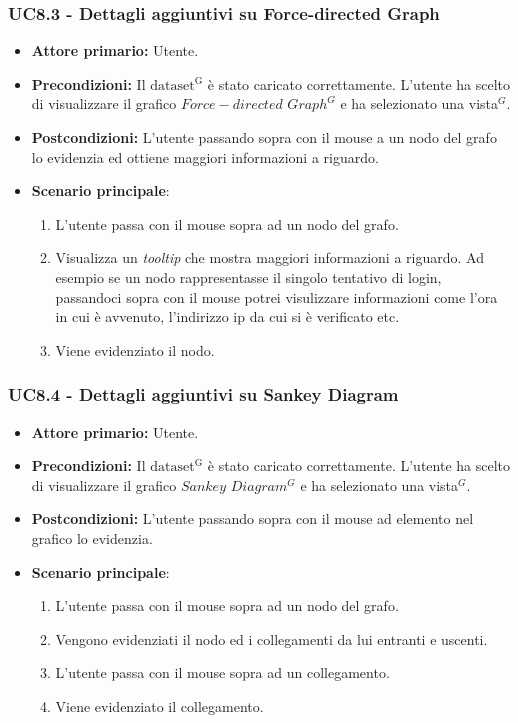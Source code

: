 \subsubsection{UC8.3 - Dettagli aggiuntivi su Force-directed Graph}
\label{sec:UC8.3}
\begin{itemize}
    \item \textbf{Attore primario:} Utente.
    \item \textbf{Precondizioni:} Il ${\mathrm{dataset^{G}}}$ è stato caricato correttamente. L'utente ha scelto di visualizzare il grafico $Force-directed$ $Graph^{G}$ e ha selezionato una vista$^{G}$.
    \item \textbf{Postcondizioni:} L'utente passando sopra con il mouse a un nodo del grafo lo evidenzia ed ottiene maggiori informazioni a riguardo.
    \item \textbf{Scenario principale}:
    \begin{enumerate}
		\item L'utente passa con il mouse sopra ad un nodo del grafo.
		\item Visualizza un \textit{tooltip} che mostra maggiori informazioni a riguardo. Ad esempio se un nodo rappresentasse il singolo tentativo di login, passandoci sopra con il mouse potrei visulizzare informazioni come l'ora in cui è avvenuto, l'indirizzo ip da cui si è verificato etc.
		\item Viene evidenziato il nodo.
	\end{enumerate}
\end{itemize}

\subsubsection{UC8.4 - Dettagli aggiuntivi su Sankey Diagram}
\label{sec:UC8.4}
\begin{itemize}
    \item \textbf{Attore primario:} Utente.
    \item \textbf{Precondizioni:} Il ${\mathrm{dataset^{G}}}$ è stato caricato correttamente. L'utente ha scelto di visualizzare il grafico $Sankey$ $Diagram^{G}$ e ha selezionato una vista$^{G}$.
    \item \textbf{Postcondizioni:} L'utente passando sopra con il mouse ad elemento nel grafico lo evidenzia.
    \item \textbf{Scenario principale}: 
    \begin{enumerate}
		\item L'utente passa con il mouse sopra ad un nodo del grafo.
		\item Vengono evidenziati il nodo ed i collegamenti da lui entranti e uscenti.
		\item L'utente passa con il mouse sopra ad un collegamento.
		\item Viene evidenziato il collegamento.
	\end{enumerate}
\end{itemize}

